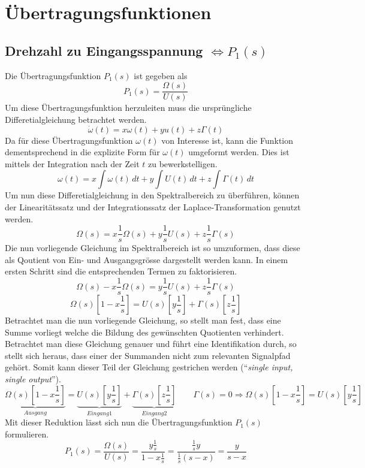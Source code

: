 \section{Übertragungsfunktionen}

\subsection{Drehzahl zu Eingangsspannung $\Leftrightarrow P_1(s)$}
Die Übertragungsfunktion $P_1(s)$ ist gegeben als
\[
	P_1(s) = \frac{\Omega(s)}{U(s)}
\]
Um diese Übertragungsfunktion herzuleiten muss die ursprüngliche
Differetialgleichung betrachtet werden.
\[
	\dot\omega(t) = x \omega(t) + y u(t) + z \Gamma(t)
\]
Da für diese Übertragungsfunktion $\omega(t)$ von Interesse ist, kann die
Funktion dementsprechend in die explizite Form für $\omega(t)$ umgeformt
werden. Dies ist mittels der Integration nach der Zeit $t$ zu bewerkstelligen.
\[
	\omega(t) =
		x \int\omega(t)\,dt
		+ y \int U(t)\,dt 
		+ z \int\Gamma(t)\,dt
\]
Um nun diese Differetialgleichung in den Spektralbereich zu überführen,
können der Linearitätssatz und der Integrationssatz der Laplace-Transformation
genutzt werden.
\[
	\Omega(s) =
		x \frac{1}{s} \Omega(s) 
		+ y \frac{1}{s} U(s)
		+ z \frac{1}{s} \Gamma(s) 
\]
Die nun vorliegende Gleichung im Spektralbereich ist so umzuformen, dass diese
als Qoutient von Ein- und Ausgangsgrösse dargestellt werden kann. In einem
ersten Schritt sind die entsprechenden Termen zu faktorisieren.
\[
	\Omega(s) - x \frac{1}{s} \Omega(s) =
		y \frac{1}{s} U(s) + z \frac{1}{s} \Gamma(s)
\]
\[
	\Omega(s) \left[ 1 - x \frac{1}{s} \right] =
		U(s) \left[ y \frac{1}{s} \right]
		+ \Gamma(s) \left[ z \frac{1}{s}\right]
\]
Betrachtet man die nun vorliegende Gleichung, so stellt man fest, dass eine
Summe vorliegt welche die Bildung des gewünschten Quotienten verhindert.
Betrachtet man diese Gleichung genauer und führt eine Identifikation durch, so
stellt sich heraus, dass einer der Summanden nicht zum relevanten Signalpfad
gehört. Somit kann dieser Teil der Gleichung gestrichen werden
(``\emph{single input, single output}'').
\[
	\underbrace{\Omega(s) \left[ 1 - x \frac{1}{s} \right]}_{Ausgang} =
		\underbrace{U(s) \left[ y \frac{1}{s} \right]}_{Eingang 1}
		+ \underbrace{\Gamma(s) \left[ z \frac{1}{s}\right]}_{Eingang 2}
	\qquad \Gamma(s) = 0 \Rightarrow
		\Omega(s) \left[ 1 - x \frac{1}{s} \right] =
		U(s) \left[ y \frac{1}{s} \right]
\]
Mit dieser Reduktion lässt sich nun die Übertragungsfunktion $P_1(s)$
formulieren.
\[
	P_1(s) = \frac{\Omega(s)}{U(s)} =
		\frac{y \frac{1}{s}}{1 - x \frac{1}{s}} = 
		\frac{\frac{1}{s} y}{\frac{1}{s} (s-x)} =
		\frac{y}{s-x}
\]

